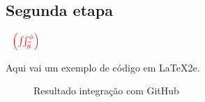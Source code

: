\subsection{Segunda etapa}




$\underline{{\color{Blue} }}{\color{red} \, \: \: \left ( \iint_{\widetilde{ \theta }}^{\phi } \right )}  $



\par Aqui vai um exemplo de código em \LaTeX2e.


\begin{figure}[H] %
  \center
  \caption{Resultado integração com GitHub}

\end{figure}
